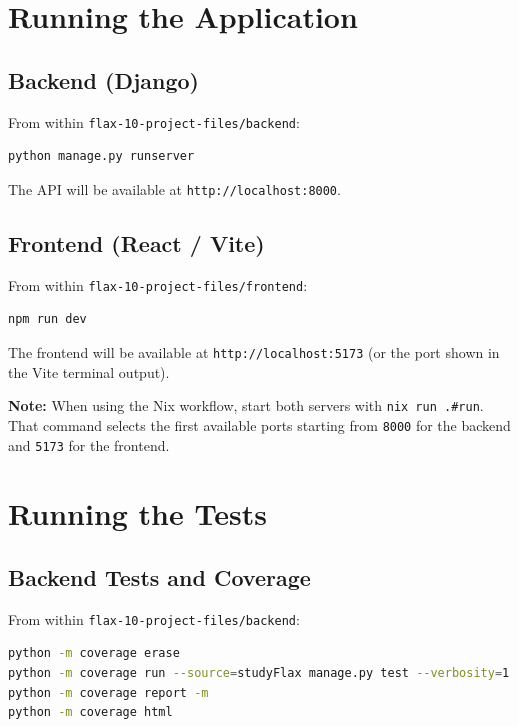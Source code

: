 \documentclass[a4paper, 12pt]{report}
\begin{document}
\chapter{Running the Application}

\section{Backend (Django)}

From within \texttt{flax-10-project-files/backend}:

\begin{lstlisting}[language=bash]
python manage.py runserver
\end{lstlisting}

The API will be available at \texttt{http://localhost:8000}.

\section{Frontend (React / Vite)}

From within \texttt{flax-10-project-files/frontend}:

\begin{lstlisting}[language=bash]
npm run dev
\end{lstlisting}

The frontend will be available at \texttt{http://localhost:5173}
(or the port shown in the Vite terminal output).

\textbf{Note:} When using the Nix workflow, start both servers with
\texttt{nix run .\#run}. That command selects the first available ports
starting from \texttt{8000} for the backend and \texttt{5173} for the
frontend.

\chapter{Running the Tests}

\section{Backend Tests and Coverage}

From within \texttt{flax-10-project-files/backend}:

\begin{lstlisting}[language=bash]
python -m coverage erase
python -m coverage run --source=studyFlax manage.py test --verbosity=1
python -m coverage report -m
python -m coverage html
\end{lstlisting}
\end{document}

